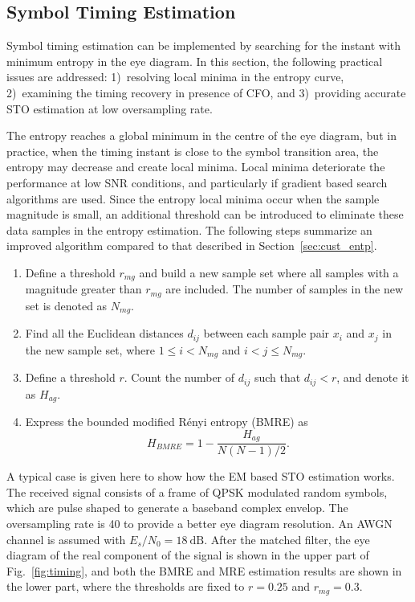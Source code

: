 \documentclass[12pt, draftclsnofoot, onecolumn]{IEEEtran}
\begin{document}
\subsection{Symbol Timing Estimation} 
\label{sec:timing}
Symbol timing estimation can be implemented by searching for the instant with minimum entropy in the eye diagram.
In this section, the following practical issues are addressed:
1)~resolving local minima in the entropy curve,  
2)~examining the timing recovery in presence of CFO, and 
3)~providing accurate STO estimation at low oversampling rate.

The entropy reaches a global minimum in the centre of the eye diagram, but in practice, when the timing instant is close to the symbol transition area, the entropy may decrease and create local minima. 
Local minima deteriorate the performance at low SNR conditions, and particularly if gradient based search algorithms are used.
Since the entropy local minima occur when the sample magnitude is small, 
an additional threshold can be introduced to eliminate these data samples in the entropy estimation.
The following steps summarize an improved algorithm compared to that described in Section~\ref{sec:cust_entp}.

\begin{enumerate}
\item Define a threshold \(r_{mg}\) and build a new sample set where all samples with a magnitude greater than \(r_{mg}\) are included.
The number of samples in the new set is denoted as \(N_{mg}\).
\item Find all the Euclidean distances \(d_{ij}\) between each sample pair \(x_i\) and \(x_j\) in the new sample set, where \(1\le i<N_{mg}\) and \( i<j \le N_{mg}\). 
\item Define a threshold \(r\). Count the number of \(d_{ij}\) such that $d_{ij}<r$, and denote it as $H_{ag}$.
\item Express the bounded modified R\'enyi entropy (BMRE) as
\begin{equation}
H_{BMRE}= 1- \frac{ H_{ag}}{ N(N-1)/2}.
\label{eq:entorpy_ad2}
\end{equation}
\end{enumerate}



A typical case is given here to show how the EM based STO estimation works.
The received signal consists of a frame of QPSK modulated random symbols, 
which are pulse shaped to generate a baseband complex envelop.
The oversampling rate is 40 to provide a better eye diagram resolution.
An AWGN channel is assumed with $E_s/N_0 = 18~\text{dB}$. 
After the matched filter, the eye diagram of the real component of the signal is shown in the upper part of Fig.~\ref{fig:timing}, and both the BMRE and MRE estimation results are shown in the lower part,
where the thresholds are fixed to $r=0.25$ and \(r_{mg}=0.3\).
\end{document}
